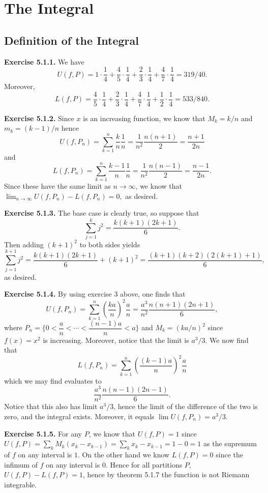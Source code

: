 \documentclass[12pt]{book}
\newcommand{\prb}[1]{\textbf{Exercise #1.}}
\begin{document}
\chapter{The Integral}
\section{Definition of the Integral}

\prb{5.1.1} We have $$U(f, P) = 1 \cdot \dfrac{1}{4} + \dfrac{4}{5} \cdot \dfrac{1}{4} + \dfrac{2}{3} \cdot \dfrac{1}{4} + \dfrac{4}{7} \cdot \dfrac{1}{4} = 319/40.$$ Moreover, $$L(f,P) = \dfrac{4}{5} \cdot \dfrac{1}{4} + \dfrac{2}{3} \cdot \dfrac{1}{4} + \dfrac{4}{7} \cdot \dfrac{1}{4} + \dfrac{1}{2} \cdot \dfrac{1}{4} = 533/840.$$

\prb{5.1.2} Since $x$ is an increasing function, we know that $M_k = k/n$ and $m_k = (k-1)/n$ hence $$U(f, P_n) = \displaystyle \sum_{k=1}^n \dfrac{k}{n} \dfrac{1}{n} = \dfrac{1}{n^2} \dfrac{n(n+1)}{2} = \dfrac{n+1}{2n}$$ and $$L(f, P_n) = \displaystyle \sum_{k=1}^n \dfrac{k-1}{n} \dfrac{1}{n} = \dfrac{1}{n^2} \dfrac{n(n-1)}{2} = \dfrac{n-1}{2n}.$$ Since these have the same limit as $n \rightarrow \infty$, we know that $\lim_{n \rightarrow \infty} U(f, P_n) - L(f, P_n) = 0,$ as desired.

\prb{5.1.3} The base case is clearly true, so suppose that $$\displaystyle \sum_{j=1}^k j^2 = \dfrac{k(k+1)(2k+1)}{6}.$$ Then adding $(k+1)^2$ to both sides yields $$\displaystyle \sum_{j=1}^{k+1} j^2 = \dfrac{k(k+1)(2k+1)}{6} + (k+1)^2 = \dfrac{(k+1)(k+2)(2(k+1)+1)}{6},$$ as desired.

\prb{5.1.4} By using exercise 3 above, one finds that $$U(f, P_n) = \sum_{k=1}^n \left(\dfrac{ka}{n}\right)^2 \dfrac{a}{n} = \dfrac{a^3}{n^2} \dfrac{n(n+1)(2n+1)}{6},$$ where $P_n = \{ 0 < \dfrac{a}{n} < \cdots < \dfrac{(n-1)a}{n} < a\}$ and $M_k = (ka/n)^2$ since $f(x) = x^2$ is increasing. Moreover, notice that the limit is $a^3/3$. We now find that $$L(f, P_n) = \sum_{k=1}^n \left(\dfrac{(k-1)a}{n}\right)^2 \dfrac{a}{n}$$ which we may find evaluates to $$\dfrac{a^3}{n^2} \dfrac{n(n-1)(2n-1)}{6}.$$ Notice that this also has limit $a^3/3$, hence the limit of the difference of the two is zero, and the integral exists. Moreover, it equals $\lim U(f, P_n) = a^3/3.$

\prb{5.1.5} For any $P$, we know that $U(f,P) = 1$ since $U(f, P) = \displaystyle \sum_k M_k (x_k - x_{k-1}) = \sum_k x_k - x_{k-1} = 1-0 = 1$ as the supremum of $f$ on any interval is $1$. On the other hand we know $L(f,P) = 0$ since the infimum of $f$ on any interval is $0$. Hence for all partitions $P$, $U(f,P) - L(f,P) = 1$, hence by theorem 5.1.7 the function is not Riemann integrable.
\end{document}
